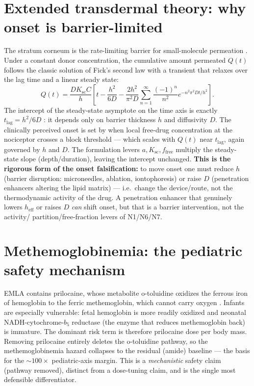 \documentclass[11pt,a4paper]{article}
\begin{document}
\section{Extended transdermal theory: why onset is barrier-limited}
\label{sec:theory}
The stratum corneum is the rate-limiting barrier for small-molecule permeation
\citep{scheuplein1971}. Under a constant donor concentration, the cumulative
amount permeated $Q(t)$ follows the classic solution of Fick's second law with
a transient that relaxes over the lag time and a linear steady state:
\begin{equation}
Q(t) = \frac{D K_{\mathrm{sc}} C}{h}\!\left[t - \frac{h^{2}}{6D}
- \frac{2h^{2}}{\pi^{2}D}\sum_{n=1}^{\infty}\frac{(-1)^n}{n^2}
e^{-n^2\pi^2 D t/h^2}\right].
\label{eq:Qt}
\end{equation}
The intercept of the steady-state asymptote on the time axis is exactly
$t_{\mathrm{lag}} = h^{2}/6D$ \citep{higuchi1960,franz1975}: it depends only on
barrier thickness $h$ and diffusivity $D$. The clinically perceived onset is set
by when local free-drug concentration at the nociceptor crosses a block
threshold --- which scales with $Q(t)$ near $t_{\mathrm{lag}}$, again governed by
$h$ and $D$. The formulation levers $a, K_{\mathrm{sc}}, f_{\mathrm{free}}$
multiply the steady-state slope (depth/duration), leaving the intercept
unchanged. \textbf{This is the rigorous form of the onset falsification:} to
move onset one must reduce $h$ (barrier disruption: microneedles, ablation,
iontophoresis) or raise $D$ (penetration enhancers altering the lipid matrix) ---
i.e.\ change the device/route, not the thermodynamic activity of the drug. A
penetration enhancer that genuinely lowers $h_{\mathrm{eff}}$ or raises $D$
\emph{can} shift onset, but that is a barrier intervention, not the activity/
partition/free-fraction levers of N1/N6/N7.

\section{Methemoglobinemia: the pediatric safety mechanism}
\label{sec:methb}
EMLA contains prilocaine, whose metabolite o-toluidine oxidizes the ferrous iron
of hemoglobin to the ferric methemoglobin, which cannot carry oxygen
\citep{methb}. Infants are especially vulnerable: fetal hemoglobin is more
readily oxidized and neonatal NADH-cytochrome-$b_5$ reductase (the enzyme that
reduces methemoglobin back) is immature. The dominant risk term is therefore
prilocaine dose per body mass. Removing prilocaine entirely deletes the
o-toluidine pathway, so the methemoglobinemia hazard collapses to the residual
(amide) baseline --- the basis for the $\sim100\times$ pediatric-axis margin.
This is a \emph{mechanistic} safety claim (pathway removed), distinct from a
dose-tuning claim, and is the single most defensible differentiator.
\end{document}
